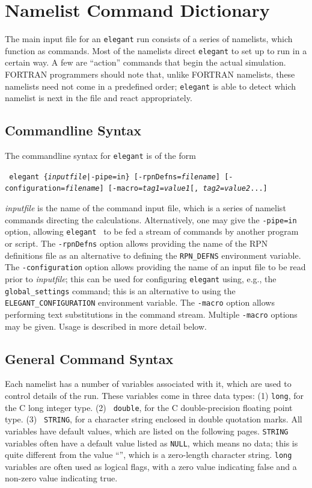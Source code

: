 \documentclass[11pt]{article}
\begin{document}
\section{Namelist Command Dictionary}

The main input file for an {\tt elegant} run consists of a series of
namelists, which function as commands.  Most of the namelists direct
{\tt elegant} to set up to run in a certain way.  A few are ``action''
commands that begin the actual simulation.  FORTRAN programmers should
note that, unlike FORTRAN namelists, these namelists need not come in
a predefined order; {\tt elegant} is able to detect which namelist is
next in the file and react appropriately.

\subsection{Commandline Syntax}

The commandline syntax for {\tt elegant} is of the form
\begin{flushleft}{\tt
elegant \{{\em inputfile}|-pipe=in\} [-rpnDefns={\em filename}] [-configuration={\em filename}] [-macro={\em tag1}={\em value1}[,{\em
tag2}={\em value2}...] }\end{flushleft} 
{\em inputfile} is the name of the command input file, which is a series of
namelist commands directing the calculations.
Alternatively, one may give the \verb|-pipe=in| option, allowing {\tt elegant } to be
fed a stream of commands by another program or script.
The \verb|-rpnDefns| option allows providing the name of the RPN definitions file as an alternative
to defining the \verb|RPN_DEFNS| environment variable.
The \verb|-configuration| option allows providing the name of an input file to be read prior to {\em inputfile};
this can be used for configuring \verb|elegant| using, e.g., the \verb|global_settings| command; this is
an alternative to using the \verb|ELEGANT_CONFIGURATION| environment variable.
The \verb|-macro| option allows performing text substitutions in the command stream.
Multiple \verb|-macro| options may be given.
Usage is described in more detail below.

\subsection{General Command Syntax}\label{sect:generalCommandSyntax}

Each namelist has a number of variables associated with it, which are
used to control details of the run.  These variables come in three
data types: (1) {\tt long}, for the C long integer type.  (2) {\tt
double}, for the C double-precision floating point type. (3) {\tt
STRING}, for a character string enclosed in double quotation marks.
All variables have default values, which are listed on the following
pages.  {\tt STRING} variables often have a default value listed as
{\tt NULL}, which means no data; this is quite different from the
value ``'', which is a zero-length character string.  {\tt long}
variables are often used as logical flags, with a zero value
indicating false and a non-zero value indicating true.
\end{document}
